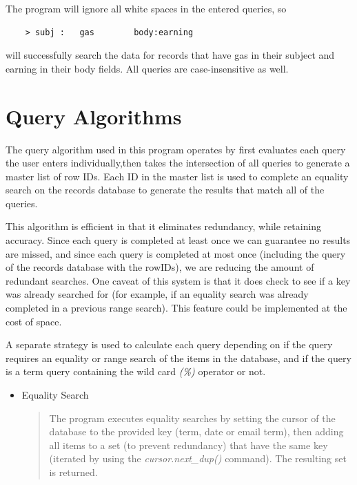 \documentclass[11pt, a4paper]{article}
\begin{document}
{The program will ignore all white spaces in the entered queries, so
\begin{lstlisting}
    > subj :   gas        body:earning
\end{lstlisting}
will successfully search the data for records that have gas in their subject and earning in their body fields. All queries are case-insensitive as well.

\section{Query Algorithms}\label{SD}
The query algorithm used in this program operates by first evaluates each query the user enters individually,then takes the intersection of all queries to generate a master list of row IDs. Each ID in the master list is used to complete an equality search on the records database to generate the results that match all of the queries.\newline

\noindent This algorithm is efficient in that it eliminates redundancy, while retaining accuracy. Since each query is completed at least once we can guarantee no results are missed, and since each query is completed at most once (including the query of the records database with the rowIDs), we are reducing the amount of redundant searches. One caveat of this system is that it does check to see if a key was already searched for (for example, if an equality search was already completed in a previous range search). This feature could be implemented at the cost of space.\newline

\noindent A separate strategy is used to calculate each query depending on if the query requires an equality or range search of the items in the database, and if the query is a term query containing the wild card \emph{(\%)} operator or not.

\begin{itemize}

\item Equality Search
	\begin{quotation}
	\noindent The program executes equality searches by setting the cursor of the database to the provided key (term, date or email term), then adding all items to a set (to prevent redundancy) that have the same key (iterated by using the \emph{cursor.next\_dup()} command). The resulting set is returned.
	\end{quotation}	


\end{itemize}}
\end{document}
